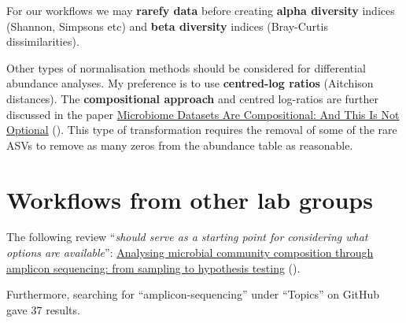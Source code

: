 \documentclass[
]{book}
\begin{document}
For our workflows we may \textbf{rarefy data} before creating \textbf{alpha diversity} indices (Shannon, Simpsons etc) and \textbf{beta diversity} indices (Bray-Curtis dissimilarities).

Other types of normalisation methods should be considered for differential abundance analyses. My preference is to use \textbf{centred-log ratios} (Aitchison distances). The \textbf{compositional approach} and centred log-ratios are further discussed in the paper \href{https://doi.org/10.3389/fmicb.2017.02224}{Microbiome Datasets Are Compositional: And This Is Not Optional} (\citet{Gloor2017}). This type of transformation requires the removal of some of the rare ASVs to remove as many zeros from the abundance table as reasonable.

\hypertarget{workflows-from-other-lab-groups}{%
\section{Workflows from other lab groups}\label{workflows-from-other-lab-groups}}

The following review ``\emph{should serve as a starting point for considering what options are available}'': \href{https://www.frontiersin.org/articles/10.3389/fmicb.2017.01561/full}{Analysing microbial community composition through amplicon sequencing: from sampling to hypothesis testing} (\citet{Hugerth2017a}).

Furthermore, searching for ``amplicon-sequencing'' under ``Topics'' on GitHub gave 37 results.
\end{document}
